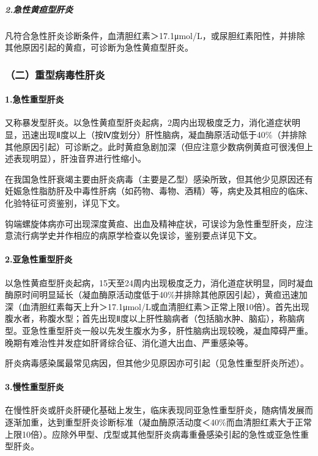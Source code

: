 \subparagraph{2.急性黄疸型肝炎}

凡符合急性肝炎诊断条件，血清胆红素＞17.1μmol/L，或尿胆红素阳性，并排除其他原因引起的黄疸，可诊断为急性黄疸型肝炎。

\subsubsection{（二）重型病毒性肝炎}

\paragraph{1.急性重型肝炎}

又称暴发型肝炎。以急性黄疸型肝炎起病，2周内出现极度乏力，消化道症状明显，迅速出现Ⅱ度以上（按Ⅳ度划分）肝性脑病，凝血酶原活动低于40\%（并排除其他原因引起）可诊断之。此时黄疸急剧加深（但应注意少数病例黄疸可很浅但上述表现明显），肝浊音界进行性缩小。

在我国急性肝衰竭主要由肝炎病毒（主要是乙型）感染所致，但其他少见原因还有妊娠急性脂肪肝及中毒性肝病（如药物、毒物、酒精）等，病史及其相应的临床、化验特征可资鉴别，详见下文。

钩端螺旋体病亦可出现深度黄疸、出血及精神症状，可误诊为急性重型肝炎，应注意流行病学史并作相应的病原学检查以免误诊，鉴别要点详见下文。

\paragraph{2.亚急性重型肝炎}

以急性黄疸型肝炎起病，15天至24周内出现极度乏力，消化道症状明显，同时凝血酶原时间明显延长（凝血酶原活动度低于40\%并排除其他原因引起），黄疸迅速加深（血清胆红素每天上升＞17.1μmol/L或血清胆红素＞正常上限10倍）。首先出现腹水者，称腹水型；首先出现Ⅱ度以上肝性脑病者（包括脑水肿、脑疝），称脑病型。亚急性重型肝炎一般以先发生腹水为多，肝性脑病出现较晚，凝血障碍严重。晚期有难治性并发症如肝肾综合征、消化道大出血、严重感染等。

肝炎病毒感染属最常见病因，但其他少见原因亦可引起（见急性重型肝炎所述）。

\paragraph{3.慢性重型肝炎}

在慢性肝炎或肝炎肝硬化基础上发生，临床表现同亚急性重型肝炎，随病情发展而逐渐加重，达到重型肝炎诊断标准（凝血酶原活动度＜40\%而血清胆红素大于正常上限10倍）。应除外甲型、戊型或其他型肝炎病毒重叠感染引起的急性或亚急性重型肝炎。


